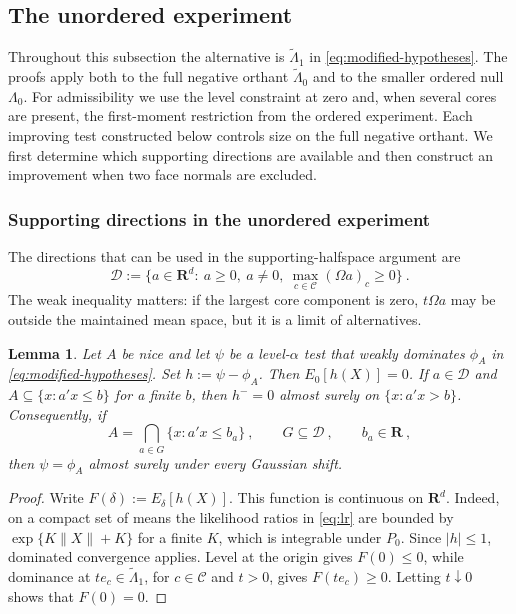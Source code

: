 \documentclass[11pt]{article}
\newcommand{\red}[1]{{\color{red}#1}} %
\numberwithin{equation}{section}
\newtheorem{lemma}{Lemma}
\theoremstyle{definition}
\begin{document}
{
\color{red}\subsection{The unordered experiment}\label{app:modified-experiment}\color{black}

\red{Throughout this subsection the alternative is $\widetilde\Lambda_1$ in \eqref{eq:modified-hypotheses}. The proofs apply both to the full negative orthant $\widetilde\Lambda_0$ and to the smaller ordered null $\Lambda_0$. For admissibility we use the level constraint at zero and, when several cores are present, the first-moment restriction from the ordered experiment. Each improving test constructed below controls size on the full negative orthant. We first determine which supporting directions are available and then construct an improvement when two face normals are excluded.}

{\color{red}\subsubsection*{Supporting directions in the unordered experiment}}

The directions that can be used in the supporting-halfspace argument are
\begin{equation}\label{eq:modified-directions}
\mathcal D:=\Big\{a\in\mathbf R^d:\ a\ge0,\ a\ne0,\ \max_{c\in\mathcal C}(\Omega a)_c\ge0\Big\}~.
\end{equation}
The weak inequality matters: if the largest core component is zero, $t\Omega a$ may be outside the maintained mean space, but it is a limit of alternatives.

\begin{samepage}
\begin{lemma}\label{lem:modified-support}
Let $A$ be nice and let $\psi$ be a level-$\alpha$ test that weakly dominates $\phi_A$ in \eqref{eq:modified-hypotheses}. Set $h:=\psi-\phi_A$. Then $E_0[h(X)]=0$. If $a\in\mathcal D$ and $A\subseteq\{x:a'x\le b\}$ for a finite $b$, then $h^-=0$ almost surely on $\{x:a'x>b\}$. Consequently, if
\[
A=\bigcap_{a\in G}\{x:a'x\le b_a\}~,
\qquad G\subseteq\mathcal D~,
\qquad b_a\in\mathbf R~,
\]
then $\psi=\phi_A$ almost surely under every Gaussian shift.
\end{lemma}
\end{samepage}

\begin{proof}
Write $F(\delta):=E_\delta[h(X)]$. This function is continuous on $\mathbf R^d$. Indeed, on a compact set of means the likelihood ratios in \eqref{eq:lr} are bounded by $\exp\{K\|X\|+K\}$ for a finite $K$, which is integrable under $P_0$. Since $|h|\le1$, dominated convergence applies. Level at the origin gives $F(0)\le0$, while dominance at $te_c\in\widetilde\Lambda_1$, for $c\in\mathcal C$ and $t>0$, gives $F(te_c)\ge0$. Letting $t\downarrow0$ shows that $F(0)=0$.


\end{proof}}
\end{document}
